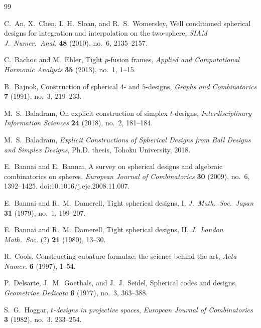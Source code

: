 \documentclass{amsart}
\theoremstyle{definition}
\theoremstyle{remark}
\numberwithin{equation}{section}
\begin{document}
\begin{thebibliography}{99}

C.~An, X.~Chen, I.~H.~Sloan, and R.~S.~Womersley,
\newblock Well conditioned spherical designs for integration and interpolation on the two-sphere,
\newblock \emph{SIAM J.\ Numer.\ Anal.} \textbf{48} (2010), no.~6, 2135--2157.

C.~Bachoc and M.~Ehler,
\newblock Tight $p$-fusion frames,
\newblock \emph{Applied and Computational Harmonic Analysis} \textbf{35} (2013), no.~1, 1--15.

B.~Bajnok,
\newblock Construction of spherical $4$- and $5$-designs,
\newblock \emph{Graphs and Combinatorics} \textbf{7} (1991), no.~3, 219--233.

M.~S.~Baladram,
\newblock On explicit construction of simplex $t$-designs,
\newblock \emph{Interdisciplinary Information Sciences} \textbf{24} (2018), no.~2, 181--184.

M.~S.~Baladram,
\newblock \emph{Explicit Constructions of Spherical Designs from Ball Designs and Simplex Designs},
\newblock Ph.D. thesis, Tohoku University, 2018.

E.~Bannai and E.~Bannai,
\newblock A survey on spherical designs and algebraic combinatorics on spheres,
\newblock \emph{European Journal of Combinatorics} \textbf{30} (2009), no.~6, 1392--1425.
\newblock doi:10.1016/j.ejc.2008.11.007.

E.~Bannai and R.~M.~Damerell,
\newblock Tight spherical designs, I,
\newblock \emph{J.\ Math.\ Soc.\ Japan} \textbf{31} (1979), no.~1, 199--207.

E.~Bannai and R.~M.~Damerell,
\newblock Tight spherical designs, II,
\newblock \emph{J.\ London Math.\ Soc.} (2) \textbf{21} (1980), 13--30.

R.~Cools,
\newblock Constructing cubature formulae: the science behind the art,
\newblock \emph{Acta Numer.} \textbf{6} (1997), 1--54.

P.~Delsarte, J.~M.~Goethals, and J.~J.~Seidel,
\newblock Spherical codes and designs,
\newblock \emph{Geometriae Dedicata} \textbf{6} (1977), no.~3, 363--388.

S.~G.~Hoggar,
\newblock \textit{$t$-designs in projective spaces},
\newblock \emph{European Journal of Combinatorics} \textbf{3} (1982), no.~3, 233--254.


\end{thebibliography}
\end{document}
